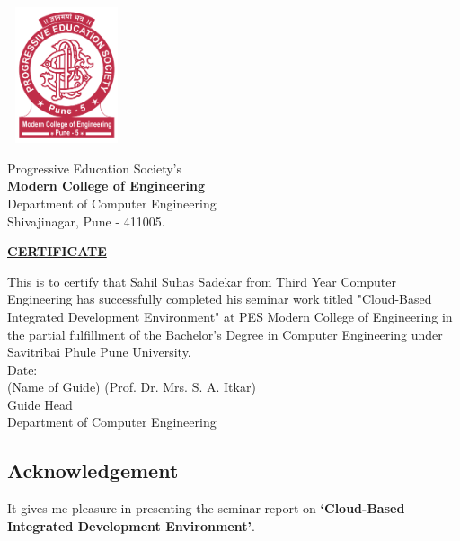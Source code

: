 \documentclass[12pt,a4paper,final]{report}
\begin{document}
\thispagestyle{empty}
\vspace*{1.3cm}
\begin{center}
\includegraphics[width=3.5cm, height=4.0cm]{logo.png}
\end{center}
\begin{center}
\Large
Progressive Education Society's \\
\textbf{Modern College of Engineering} \\
Department of Computer Engineering\\
Shivajinagar, Pune - 411005. \\
\vspace{1cm}

\underline{\textbf{CERTIFICATE}}
\end{center}
\normalsize
\vspace{0.5cm}
This is to certify that Sahil Suhas Sadekar from Third Year Computer 
Engineering has successfully completed his seminar work titled "Cloud-Based Integrated Development Environment" at PES Modern College of Engineering in the partial fulfillment of the Bachelor's Degree in 
Computer Engineering under Savitribai Phule Pune University. \vspace{1cm}\\ 
Date: \vspace{1cm} \\

(Name of Guide)
\hspace*{7.5cm}(Prof. Dr. Mrs. S. A. Itkar) \\
\hspace*{0.5cm} Guide \hspace{10.5cm}Head \\
\hspace*{10cm}Department of Computer Engineering \\


\thispagestyle{empty}
\Large
\begin{center}
\chapter*{\centering Acknowledgement}
\end{center}
\normalsize
It gives me pleasure in presenting the seminar report on \textbf{`Cloud-Based Integrated Development Environment'}.\\
\end{document}
